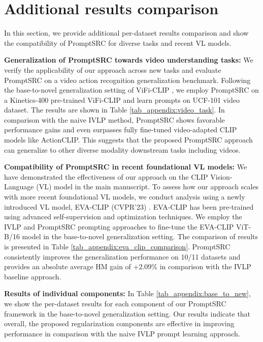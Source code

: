 \documentclass[10pt,twocolumn,letterpaper]{article}
\begin{document}
\section{Additional results comparison}
\label{appendix:base2novel_per_component_per_dataset}
In this section, we provide additional per-dataset results comparison and show the compatibility of PromptSRC for diverse tasks and recent VL models.


\noindent \textbf{{Generalization of PromptSRC towards video understanding tasks:}} We verify the applicability of our approach across new tasks and evaluate PromptSRC on a video action recognition generalization benchmark. Following the base-to-novel generalization setting of ViFi-CLIP \cite{rasheed2023fine}, we employ PromptSRC on a Kinetics-400 pre-trained ViFi-CLIP \cite{rasheed2023fine} and learn prompts on UCF-101 video dataset. The results are shown in Table \ref{tab_appendix:video_task}. In comparison with the naive IVLP method, PromptSRC shows favorable performance gains and even surpasses fully fine-tuned video-adapted CLIP models like ActionCLIP. This suggests that the proposed PromptSRC approach can generalize to other diverse modality downstream tasks including videos.





\noindent \textbf{{Compatibility of PromptSRC in recent foundational VL models:}} We have demonstrated the effectiveness of our approach on the CLIP  Vision-Language (VL) model in the main manuscript. To assess how our approach scales with more recent foundational VL models, we conduct analysis using a newly introduced VL model, EVA-CLIP (CVPR'23) \cite{fang2023eva}. EVA-CLIP has been pre-trained using advanced self-supervision and optimization techniques. We employ the IVLP and PromptSRC prompting approaches to fine-tune the EVA-CLIP ViT-B/16 model in the base-to-novel generalization setting. The comparison of results is presented in Table \ref{tab_appendix:eva_clip_comparison}. PromptSRC consistently improves the generalization performance on 10/11 datasets and provides an absolute average HM gain of +2.09\% in comparison with the IVLP baseline approach.

\noindent \textbf{{Results of individual components:}} In Table \ref{tab_appendix:base_to_new}, we show the per-dataset results for each component of our PromptSRC framework in the base-to-novel generalization setting. Our results indicate that overall, the proposed regularization components are effective in improving performance in comparison with the naive IVLP prompt learning approach.
\end{document}
